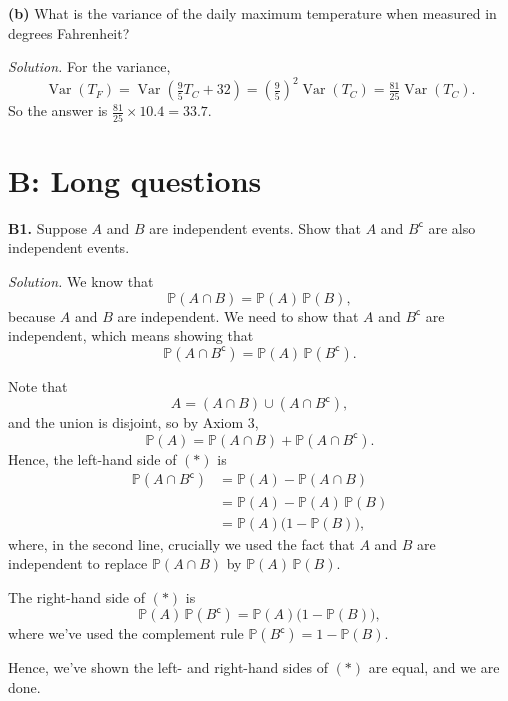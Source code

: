 \documentclass[
  a4paper,
]{book}
\theoremstyle{definition}
\theoremstyle{definition}
\theoremstyle{definition}
\theoremstyle{definition}
\theoremstyle{remark}
\begin{document}
\textbf{(b)} What is the variance of the daily maximum temperature when measured in degrees Fahrenheit?

\begin{myanswers}
\emph{Solution.}
For the variance,
\[ \operatorname{Var}(T_F) = \operatorname{Var}\left(\tfrac95T_C + 32\right) = \left(\tfrac95\right)^2 \operatorname{Var}(T_C) = \tfrac{81}{25}\operatorname{Var}(T_C). \]
So the answer is \(\frac{81}{25} \times 10.4 = 33.7\).

\end{myanswers}

\hypertarget{P3-long}{%
\section*{B: Long questions}\label{P3-long}}

\textbf{B1.} Suppose \(A\) and \(B\) are independent events. Show that \(A\) and \(B^\mathsf{c}\) are also independent events.

\begin{myanswers}
\emph{Solution.} We know that
\[ \mathbb P(A \cap B) = \mathbb P(A) \, \mathbb P(B) , \]
because \(A\) and \(B\) are independent.
We need to show that \(A\) and \(B^\mathsf{c}\) are independent, which means showing that
\[ \mathbb P(A \cap B^\mathsf{c}) = \mathbb P(A) \, \mathbb P(B^\mathsf{c}) . \tag{$*$} \]

Note that
\[ A = (A \cap B) \cup (A \cap B^\mathsf{c}) , \]
and the union is disjoint, so by Axiom 3,
\[ \mathbb P(A) = \mathbb P(A \cap B) + \mathbb P(A \cap B^\mathsf{c}) . \]
Hence, the left-hand side of \((*)\) is
\begin{align*}
\mathbb P(A \cap B^\mathsf{c})
&= \mathbb P(A) - \mathbb P(A \cap B) \\
&= \mathbb P(A) - \mathbb P(A)\,\mathbb P(B) \\
&= \mathbb P(A) \big(1 - \mathbb P(B)\big) ,
\end{align*}
where, in the second line, crucially we used the fact that \(A\) and \(B\) are independent to replace \(\mathbb P(A \cap B)\) by \(\mathbb P(A)\,\mathbb P(B)\).

The right-hand side of \((*)\) is
\[\mathbb P(A) \, \mathbb P(B^\mathsf{c}) = \mathbb P(A) \big(1 - \mathbb P(B)\big) , \]
where we've used the complement rule \(\mathbb P(B^\mathsf{c}) = 1- \mathbb P(B)\).

Hence, we've shown the left- and right-hand sides of \((*)\) are equal, and we are done.

\end{myanswers}
\end{document}
